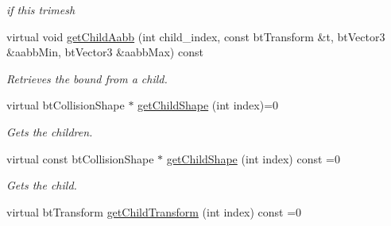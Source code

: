 \begin{Indent}{\bf }
\begin{CompactItemize}
\begin{CompactList}\small\item\em if this trimesh \item\end{CompactList}\item 
\hypertarget{classbt_g_impact_shape_interface_341963a807a574ec30ae60284c831f5b}{
virtual void \hyperlink{classbt_g_impact_shape_interface_341963a807a574ec30ae60284c831f5b}{getChildAabb} (int child\_\-index, const btTransform \&t, btVector3 \&aabbMin, btVector3 \&aabbMax) const }
\label{classbt_g_impact_shape_interface_341963a807a574ec30ae60284c831f5b}

\begin{CompactList}\small\item\em Retrieves the bound from a child. \item\end{CompactList}\item 
\hypertarget{classbt_g_impact_shape_interface_9f2827a4cb6e8376eb54aea84a8cc87b}{
virtual btCollisionShape $\ast$ \hyperlink{classbt_g_impact_shape_interface_9f2827a4cb6e8376eb54aea84a8cc87b}{getChildShape} (int index)=0}
\label{classbt_g_impact_shape_interface_9f2827a4cb6e8376eb54aea84a8cc87b}

\begin{CompactList}\small\item\em Gets the children. \item\end{CompactList}\item 
\hypertarget{classbt_g_impact_shape_interface_0f89806a197c690e295ba0f60559b015}{
virtual const btCollisionShape $\ast$ \hyperlink{classbt_g_impact_shape_interface_0f89806a197c690e295ba0f60559b015}{getChildShape} (int index) const =0}
\label{classbt_g_impact_shape_interface_0f89806a197c690e295ba0f60559b015}

\begin{CompactList}\small\item\em Gets the child. \item\end{CompactList}\item 
\hypertarget{classbt_g_impact_shape_interface_c06b1f597e2b628bf1e0523ab1c62d08}{
virtual btTransform \hyperlink{classbt_g_impact_shape_interface_c06b1f597e2b628bf1e0523ab1c62d08}{getChildTransform} (int index) const =0}
\label{classbt_g_impact_shape_interface_c06b1f597e2b628bf1e0523ab1c62d08}


\end{CompactItemize}
\end{Indent}
